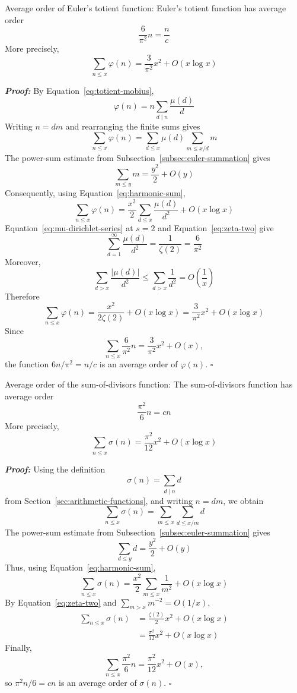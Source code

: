 \documentclass[a4paper,11pt,abstracton]{scrartcl}
\theoremstyle{dotlessP}
\theoremstyle{dotlessS}
\theoremstyle{remark}
\theoremstyle{definition}
\begin{document}
\begin{mainbox}{Average order of Euler's totient function:}
Euler's totient function has average order
\[
    \frac{6}{\pi^2}n=\frac{n}{c}
\]
More precisely,
\[
    \sum_{n\leq x}\varphi(n)
      =\frac{3}{\pi^2}x^2+O(x\log x)
\]
\end{mainbox}

\begin{claim_box}
\textbf{\textit{Proof:}}
By Equation~\eqref{eq:totient-mobius},
\[
    \varphi(n)=n\sum_{d\mid n}\frac{\mu(d)}d
\]
Writing $n=dm$ and rearranging the finite sums gives
\[
    \sum_{n\leq x}\varphi(n)
      =\sum_{d\leq x}\mu(d)
        \sum_{m\leq x/d}m
\]
The power-sum estimate from
Subsection~\ref{subsec:euler-summation} gives
\[
    \sum_{m\leq y}m=\frac{y^2}{2}+O(y)
\]
Consequently, using Equation~\eqref{eq:harmonic-sum},
\[
    \sum_{n\leq x}\varphi(n)
      =\frac{x^2}{2}
        \sum_{d\leq x}\frac{\mu(d)}{d^2}
        +O(x\log x)
\]
Equation~\eqref{eq:mu-dirichlet-series} at $s=2$ and
Equation~\eqref{eq:zeta-two} give
\[
    \sum_{d=1}^{\infty}\frac{\mu(d)}{d^2}
      =\frac1{\zeta(2)}=\frac6{\pi^2}
\]
Moreover,
\[
    \sum_{d>x}\frac{|\mu(d)|}{d^2}
      \leq\sum_{d>x}\frac1{d^2}
      =O\!\left(\frac1x\right)
\]
Therefore
\[
    \sum_{n\leq x}\varphi(n)
      =\frac{x^2}{2\zeta(2)}+O(x\log x)
      =\frac3{\pi^2}x^2+O(x\log x)
\]
Since
\[
    \sum_{n\leq x}\frac6{\pi^2}n
      =\frac3{\pi^2}x^2+O(x),
\]
the function $6n/\pi^2=n/c$ is an average order of $\varphi(n)$.
\hfill$\square$
\end{claim_box}

\begin{mainbox}{Average order of the sum-of-divisors function:}
The sum-of-divisors function has average order
\[
    \frac{\pi^2}{6}n=cn
\]
More precisely,
\[
    \sum_{n\leq x}\sigma(n)
      =\frac{\pi^2}{12}x^2+O(x\log x)
\]
\end{mainbox}

\begin{claim_box}
\textbf{\textit{Proof:}}
Using the definition
\[
    \sigma(n)=\sum_{d\mid n}d
\]
from Section~\ref{sec:arithmetic-functions}, and writing $n=dm$, we
obtain
\[
    \sum_{n\leq x}\sigma(n)
      =\sum_{m\leq x}\sum_{d\leq x/m}d
\]
The power-sum estimate from
Subsection~\ref{subsec:euler-summation} gives
\[
    \sum_{d\leq y}d=\frac{y^2}{2}+O(y)
\]
Thus, using Equation~\eqref{eq:harmonic-sum},
\[
    \sum_{n\leq x}\sigma(n)
      =\frac{x^2}{2}\sum_{m\leq x}\frac1{m^2}
        +O(x\log x)
\]
By Equation~\eqref{eq:zeta-two} and
$\sum_{m>x}m^{-2}=O(1/x)$,
\begin{align*}
    \sum_{n\leq x}\sigma(n)
      &=\frac{\zeta(2)}2x^2+O(x\log x)\\
      &=\frac{\pi^2}{12}x^2+O(x\log x)
\end{align*}
Finally,
\[
    \sum_{n\leq x}\frac{\pi^2}{6}n
      =\frac{\pi^2}{12}x^2+O(x),
\]
so $\pi^2n/6=cn$ is an average order of $\sigma(n)$.
\hfill$\square$
\end{claim_box}
\end{document}
